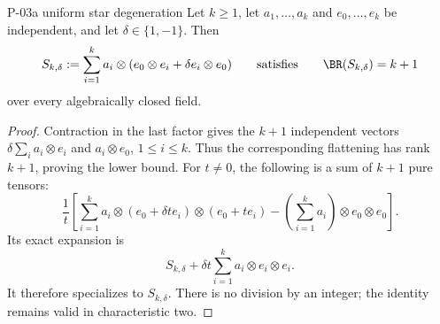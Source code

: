 \begin{finding}{P-03}{a uniform star degeneration}
Let \(k\geq1\), let \(a_1,\ldots,a_k\) and \(e_0,\ldots,e_k\)
be independent, and let \(\delta\in\{1,-1\}\). Then
\[
 S_{k,\delta}:=\sum_{i=1}^k
 a_i\otimes(e_0\otimes e_i+\delta e_i\otimes e_0)
 \qquad\text{satisfies}\qquad
 \BR(S_{k,\delta})=k+1
\]
over every algebraically closed field.
\end{finding}
\begin{proof}
Contraction in the last factor gives the \(k+1\) independent
vectors
\(\delta\sum_i a_i\otimes e_i\) and \(a_i\otimes e_0\),
\(1\leq i\leq k\). Thus the corresponding flattening has rank
\(k+1\), proving the lower bound.
For \(t\ne0\), the following is a sum of \(k+1\) pure tensors:
\[
 \frac1t\left[
 \sum_{i=1}^k a_i\otimes(e_0+\delta t e_i)\otimes(e_0+t e_i)
 -\left(\sum_{i=1}^k a_i\right)\otimes e_0\otimes e_0
 \right].
\]
Its exact expansion is
\[
 S_{k,\delta}+\delta t\sum_{i=1}^k a_i\otimes e_i\otimes e_i.
\]
It therefore specializes to \(S_{k,\delta}\). There is no
division by an integer; the identity remains valid in
characteristic two.
\end{proof}

